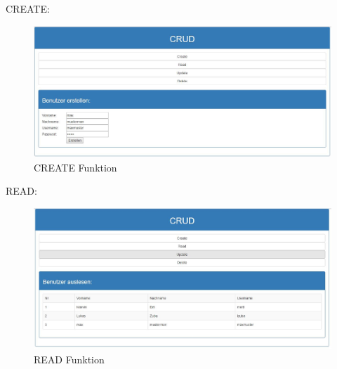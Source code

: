 CREATE:
\begin{figure}[!h]
\centering
\includegraphics[width=1\linewidth]{images/create}
\caption{CREATE Funktion}
\label{fig:create}
\end{figure}
\clearpage
READ:
\begin{figure}[!h]
\centering
\includegraphics[width=0.9\linewidth]{images/read}
\caption{READ Funktion}
\label{fig:read}
\end{figure}

